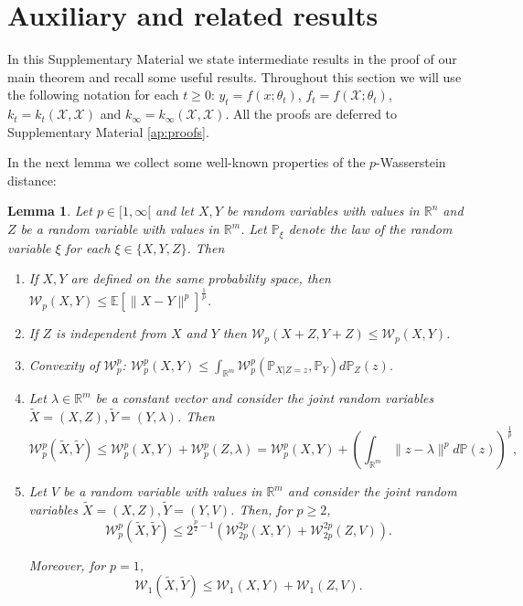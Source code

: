 \documentclass{article}
\newtheorem{lem}[thm]{Lemma}
\theoremstyle{definition}
\theoremstyle{remark}
\numberwithin{equation}{section}
\newcommand{\X}{\mathcal{X}}
\newcommand{\R}{\mathbb{R}}
\newcommand{\E}{\mathbb{E}}
\newcommand{\norm}[2]{
    \|#1\|_{#2}
}
\begin{document}
\section{Auxiliary and related results}
\label{ap:auxiliary}

In this Supplementary Material we state intermediate results in the proof of our main theorem and recall some useful results.
Throughout this section we will use the following notation for each $t\ge 0$: $y_t=f(x;\theta_t)$, $f_t=f(\X;\theta_t)$, $k_t = k_t(\X,\X)$ and $k_\infty = k_\infty(\X,\X)$.
All the proofs are deferred to Supplementary Material \ref{ap:proofs}.

In the next lemma we collect some well-known properties of the $p$-Wasserstein distance:

\begin{lem}\label{thm:wass_properties}
    Let $p \in [1, \infty[$ and let $X,Y$ be random variables with values in $\R^n$ and $Z$ be a random variable with values in $\R^m$. 
    Let $\mathbb P_\xi$ denote the law of the random variable $\xi$ for each $\xi \in \{X,Y,Z\}$. Then
    \begin{enumerate}
        \item If $X, Y$ are defined on the same probability space, then $\mathcal W_p(X,Y) \le \E[\norm{X - Y}{}^p]^{\frac{1}{p}}$.
        \item If $Z$ is independent from $X$ and $Y$ then $\mathcal W_p(X+Z,Y+Z) \le \mathcal W_p(X,Y)$.
        \item Convexity of $\mathcal W_p^p$: $\mathcal W_p^p(X,Y) \le \int_{\R^m} \mathcal W_p^p(\mathbb P_{X \vert Z = z},\mathbb P_Y)d\mathbb P_Z(z)$. 
         \item Let $\lambda \in \R^m$ be a constant vector and consider the joint random variables $\tilde X = (X,Z), \tilde Y = (Y, \lambda)$. Then 
        \[\mathcal W_p^p(\tilde X, \tilde Y) \le \mathcal W_p^p(X, Y) + \mathcal W_p^p(Z, \lambda) = \mathcal W_p^p(X, Y) + \left(\int_{\R^m} \norm{z-\lambda}{}^p d\mathbb P(z)\right)^{\frac{1}{p}},\]
        \item Let $V$ be a random variable with values in $\R^m$ and consider the joint random variables $\tilde X = (X,Z), \tilde Y = (Y, V)$. Then, for $p \ge 2$, 
        \[\mathcal W_p^p(\tilde X, \tilde Y) \le 2^{\frac{p}{2}-1}\left(\mathcal W_{2p}^{2p}(X, Y) + \mathcal W_{2p}^{2p}(Z, V)\right).\]

        Moreover, for $p=1$,
        \[\mathcal W_1(\tilde X, \tilde Y) \le \mathcal W_1(X, Y) + \mathcal W_1(Z, V).\]
    \end{enumerate}
\end{lem}
\end{document}
